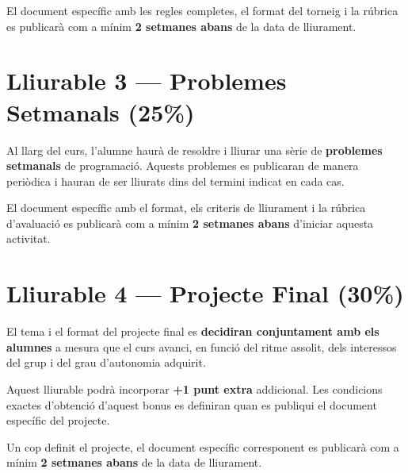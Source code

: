 El document espec\'ific amb les regles completes, el format del torneig i la r\'ubrica es publicar\`a com a m\'inim \textbf{2 setmanes abans} de la data de lliurament.

\section{Lliurable 3 --- Problemes Setmanals (25\%)}

Al llarg del curs, l'alumne haur\`a de resoldre i lliurar una s\`erie de \textbf{problemes setmanals} de programaci\'o. Aquests problemes es publicaran de manera peri\`odica i hauran de ser lliurats dins del termini indicat en cada cas.

El document espec\'ific amb el format, els criteris de lliurament i la r\'ubrica d'avaluaci\'o es publicar\`a com a m\'inim \textbf{2 setmanes abans} d'iniciar aquesta activitat.

\section{Lliurable 4 --- Projecte Final (30\%)}

El tema i el format del projecte final es \textbf{decidiran conjuntament amb els alumnes} a mesura que el curs avanci, en funci\'o del ritme assolit, dels interessos del grup i del grau d'autonomia adquirit.

Aquest lliurable podr\`a incorporar \textbf{+1 punt extra} addicional. Les condicions exactes d'obtenci\'o d'aquest bonus es definiran quan es publiqui el document espec\'ific del projecte.

Un cop definit el projecte, el document espec\'ific corresponent es publicar\`a com a m\'inim \textbf{2 setmanes abans} de la data de lliurament.
